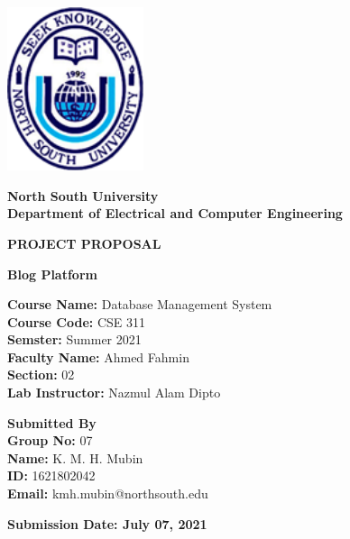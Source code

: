 \documentclass{article}
\begin{document}
\begin{titlepage}
\begin{center}
\includegraphics[width=4cm]{NSU_LOGO.png}
\vspace{0.5cm}

\textbf{\LARGE North South University} \\
\vspace{0.5cm}
\textbf{\Large Department of Electrical and Computer Engineering}\\
\vspace{0.5cm}

\textbf{\MakeUppercase{Project Proposal}}

\vspace{1cm}

\textbf{\LARGE Blog Platform}

\vspace{0.7cm}
   
\end{center}

\begin{flushleft}

\textbf{Course Name:} Database Management System\\
\textbf{Course Code:} CSE 311\\
\textbf{Semster:} Summer 2021 \\
\textbf{Faculty Name:} Ahmed Fahmin\\
\textbf{Section:} 02\\
\textbf{Lab Instructor:} Nazmul Alam Dipto\\

\vspace{1cm}

\textbf{\large Submitted By}\\
\vspace{0.3cm}
\textbf{Group No:} 07\\
\textbf{Name:} K. M. H. Mubin\\
\textbf{ID:} 1621802042\\
\textbf{Email:} kmh.mubin@northsouth.edu\\

\vspace{1cm}

\end{flushleft}

\vspace*{\fill}
\centering
\textbf{\Large Submission Date: July 07, 2021}

\end{titlepage}
\end{document}
